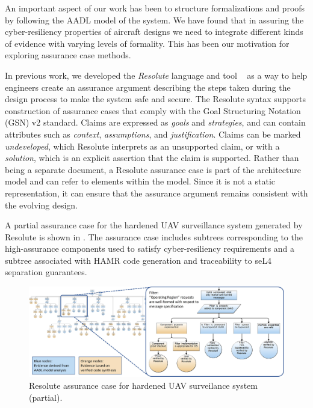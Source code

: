 An important aspect of our work has been to structure formalizations and proofs by following
the AADL model of the system. 
We have found that in assuring the cyber-resiliency properties of aircraft designs we need to integrate
different kinds of evidence with varying levels of formality. This has been our motivation
for exploring assurance case methods.

In previous work, we developed the {\em Resolute} language and tool
~\cite{resolute-destion} as a way to help engineers create an assurance
argument describing the steps taken during the design process to make the system safe and secure.
The Resolute syntax supports construction of assurance cases that comply with the Goal Structuring
Notation (GSN) v2 standard.
Claims are expressed as \textit{goals} and
\textit{strategies}, and can contain attributes such as \textit{context}, \textit{assumptions}, and
\textit{justification}. Claims can be marked \textit{undeveloped}, which Resolute interprets as an
unsupported claim, or with a \textit{solution}, which is an explicit assertion that the claim is
supported. Rather than being a separate document, a Resolute assurance case is part of the
architecture model and can refer to elements within the model. Since it is not a static
representation, it can ensure that the assurance argument remains consistent with the evolving
design.  

A partial assurance case for the hardened UAV surveillance system generated by Resolute 
is shown in .  
The assurance case includes subtrees corresponding to the high-assurance components 
used to satisfy cyber-resiliency requirements and a subtree associated
with HAMR code generation and traceability to seL4 separation guarantees.  

\begin{figure} 
\centering 
\includegraphics[width=\textwidth]{figs/assurance-case.jpg}
\caption{Resolute assurance case for hardened UAV surveilance system (partial). 
}
\label{fig:assurance-case} 
\end{figure}

